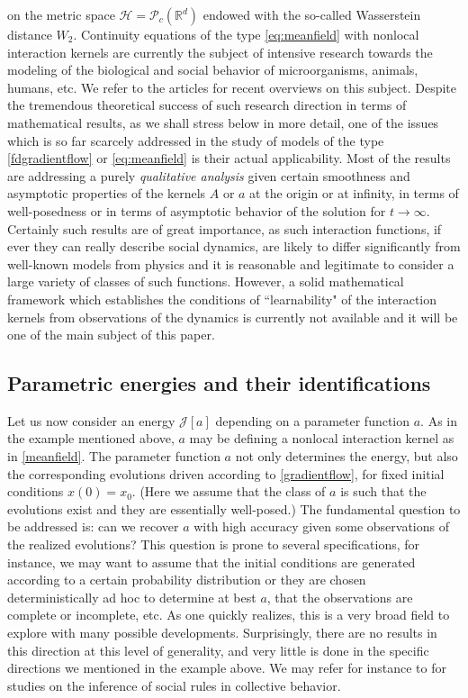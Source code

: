 \documentclass[A4paper,11pt]{article}
\theoremstyle{definition}
\begin{document}
on the metric space $\mathcal H =\mathcal P_c(\mathbb R^d)$ endowed with the so-called Wasserstein distance $W_2$. Continuity equations of the type \eqref{eq:meanfield} with nonlocal interaction kernels are currently the subject of intensive research  towards the modeling of the biological and social behavior of microorganisms, animals, humans, etc. We refer to the  articles \cite{cafotove10,13-Carrillo-Choi-Hauray-MFL} for recent overviews on this subject. Despite the tremendous theoretical success of such research direction in terms of mathematical results, as we shall stress below in more detail, one of the issues which is so far scarcely addressed in the study of models of the type \eqref{fdgradientflow} or \eqref{eq:meanfield} is their actual applicability. Most of the results are addressing a purely {\it qualitative analysis} given certain smoothness and asymptotic properties of the kernels $A$ or $a$ at the origin or at infinity, in terms of well-posedness or in terms of asymptotic behavior of the solution for $t \to \infty$.  Certainly such results are of great importance, as such interaction functions, if ever they can really describe social dynamics,  are likely to differ significantly from well-known models from physics and it is reasonable and legitimate to consider a large variety of classes of such functions.
However, a solid mathematical framework which establishes the conditions of ``learnability" of the interaction kernels from observations of the dynamics is currently not available and it will be one of the main subject of this paper.

\subsection{Parametric energies and their identifications}

Let us now consider an energy $\mathcal J[a]$ depending on a parameter function $a$. As in the example mentioned above, $a$ may be defining a nonlocal interaction kernel as in  \eqref{meanfield}. The parameter function $a$ not only determines the energy, but also the corresponding evolutions driven according to \eqref{gradientflow}, for fixed initial conditions $x(0)=x_0$. (Here we assume that the class of $a$ is such that the evolutions exist and they are essentially well-posed.)
The fundamental question to be addressed is: can we recover $a$ with high accuracy given some observations of the realized evolutions? This question is prone to several specifications, for instance, we may want to assume that the initial conditions are generated according to a certain probability distribution or they are chosen deterministically ad hoc to determine at best $a$, that the observations are complete or incomplete, etc. As one  quickly realizes, this is a very broad field to explore with many possible developments. Surprisingly, there are no results in this direction at this level of generality, and very little is done in the specific directions we mentioned in the example above. We may refer for instance to \cite{mann11,heoemascszwa11} for studies on the inference of social rules in collective behavior. 
\end{document}
